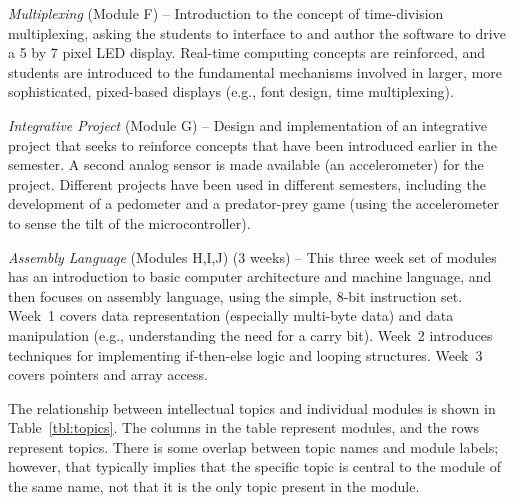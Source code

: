 \emph{Multiplexing} (Module F) --
Introduction to the concept of time-division multiplexing, asking the
students to interface to and author the software to drive a 5 by 7 pixel
LED display. Real-time computing concepts are reinforced, and students
are introduced to the fundamental mechanisms involved in larger, more
sophisticated, pixed-based displays (e.g., font design, time multiplexing).

\emph{Integrative Project} (Module G) --
Design and implementation of an integrative project
that seeks to reinforce concepts that have been introduced earlier in the
semester.  A second analog sensor is made available (an accelerometer)
for the project.
Different projects have been used in different semesters, including
the development of a pedometer and a predator-prey game (using the
accelerometer to sense the tilt of the microcontroller).

\emph{Assembly Language} (Modules H,I,J) (3 weeks) --
This three week set of modules has an introduction to basic computer
architecture
and machine language, and then
focuses on assembly language, using the simple, 8-bit instruction set.
Week~1 covers data representation (especially multi-byte
data) and data manipulation
(e.g., understanding the need for a carry bit).
Week~2 introduces techniques for implementing if-then-else logic
and looping structures.
Week~3 covers pointers and array access.

The relationship between intellectual topics and individual modules is
shown in Table~\ref{tbl:topics}. The columns in the table represent
modules, and the rows represent topics.
There is some overlap between topic names and module labels; however, that
typically implies that the specific topic is central to the module of the
same name, not that it is the only topic present in the module.

